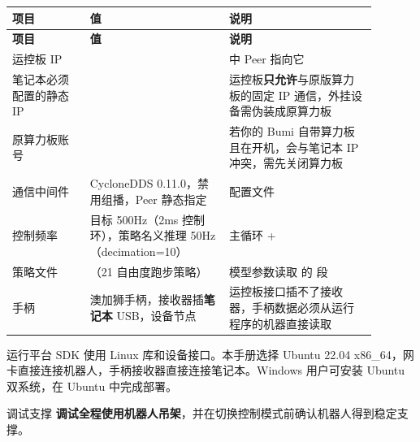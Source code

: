 \begin{longtable}{@{}P{0.19\linewidth}P{0.34\linewidth}P{0.36\linewidth}@{}}
\toprule
\textbf{项目} & \textbf{值} & \textbf{说明} \\
\midrule
\endfirsthead
\toprule
\textbf{项目} & \textbf{值} & \textbf{说明} \\
\midrule
\endhead
\bottomrule
\endfoot
运控板 IP &  &  中 Peer 指向它 \\
笔记本必须配置的静态 IP &  & 运控板\textbf{只允许}与原版算力板的固定 IP 通信，外挂设备需伪装成原算力板 \\
原算力板账号 &  & 若你的 Bumi 自带算力板且在开机，会与笔记本 IP 冲突，需先关闭算力板 \\
通信中间件 & CycloneDDS 0.11.0，禁用组播，Peer 静态指定 & 配置文件  \\
控制频率 & 目标 500Hz（2ms 控制环），策略名义推理 50Hz（decimation=10） &  主循环 +  \\
策略文件 & （21 自由度跑步策略） & 模型参数读取  的  段 \\
手柄 & 澳加狮手柄，接收器插\textbf{笔记本} USB，设备节点  & 运控板接口插不了接收器，手柄数据必须从运行程序的机器直接读取 \\
\end{longtable}

\begin{remark}{运行平台}
SDK 使用 Linux 库和设备接口。本手册选择 Ubuntu 22.04 x86\_64，网卡直接连接机器人，手柄接收器直接连接笔记本。Windows 用户可安装 Ubuntu 双系统，在 Ubuntu 中完成部署。
\end{remark}

\begin{remark}{调试支撑}
\textbf{调试全程使用机器人吊架}，并在切换控制模式前确认机器人得到稳定支撑。
\end{remark}
